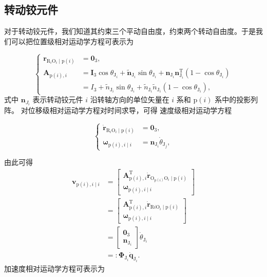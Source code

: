 \subsection{转动铰元件}
对于转动铰元件，我们知道其约束三个平动自由度，约束两个转动自由度。于是我们可以把位置级相对运动学方程可表示为

\[
\left\{\begin{aligned}
\boldsymbol{r}_{\mathrm{R}_{i} \mathrm{O}_{i} \mid \mathrm{p}(i)} & =\mathbf{0}_{3}, \\
\boldsymbol{A}_{\mathrm{p}(i), i} & =\boldsymbol{I}_{3} \cos \theta_{\mathrm{J}_{i}}+\tilde{\boldsymbol{n}}_{\mathrm{J}_{i}} \sin \theta_{\mathrm{J}_{i}}+\boldsymbol{n}_{\mathrm{J}_{i}} \boldsymbol{n}_{\mathrm{J}_{i}}^{\mathrm{T}}\left(1-\cos \theta_{\mathrm{J}_{i}}\right) \\
& =I_{3}+\tilde{n}_{\mathrm{J}_{i}} \sin \theta_{\mathrm{J}_{i}}+\tilde{n}_{\mathrm{J}_{i}} \tilde{n}_{\mathrm{J}_{i}}\left(1-\cos \theta_{\mathrm{J}_{i}}\right),
\end{aligned}\right.
\]
式中  $\boldsymbol{n}_{J_{i}}$  表示转动铰元件  $i$  沿转轴方向的单位矢量在  $i$  系和  $\mathrm{p}(i)$  系中的投影列阵。
对位移级相对运动学方程对时间求导，可得 速度级相对运动学方程

\[
\left\{\begin{aligned}
\dot{\boldsymbol{r}}_{\mathrm{R}_{i} \mathrm{O}_{i} \mid \mathrm{p}(i)} & =\mathbf{0}_{3}, \\
\boldsymbol{\omega}_{\mathrm{p}(i), i \mid i} & =\boldsymbol{n}_{\mathrm{J}_{i}} \dot{\theta}_{\mathrm{J}_{j}},
\end{aligned}\right.
\]

由此可得
\[
\begin{aligned}
\boldsymbol{v}_{\mathrm{p}(i), i \mid i} & =\left[\begin{array}{c}
\boldsymbol{A}_{\mathrm{p}(i), i}^{\mathrm{T}} \dot{\boldsymbol{r}}_{\mathrm{O}_{\mathrm{p}(i)} \mathrm{O}_{i}\mid \mathrm{p}(i)}   \\
\boldsymbol{\omega}_{\mathrm{p}(i), i \mid i}
\end{array}\right] \\
& =\left[\begin{array}{c}
\boldsymbol{A}_{\mathrm{p}(i), i}^{\mathrm{T}} \dot{\boldsymbol{r}}_{\mathrm{R} i\mathrm{O}_{i} \mid \mathrm{p}(i) } \\
\boldsymbol{\omega}_{\mathrm{p}(i), i \mid i}
\end{array}\right] \\
& =\left[\begin{array}{c}
\mathbf{0}_{3} \\
\boldsymbol{n}_{\mathrm{J}_{i}}
\end{array}\right] \dot{\theta}_{\mathrm{J}_{i}} \\
& =: \boldsymbol{\Phi}_{\mathrm{J}_{i}} \dot{\boldsymbol{q}}_{\mathrm{J}_{i}} .
\end{aligned}
\]
加速度相对运动学方程可表示为

